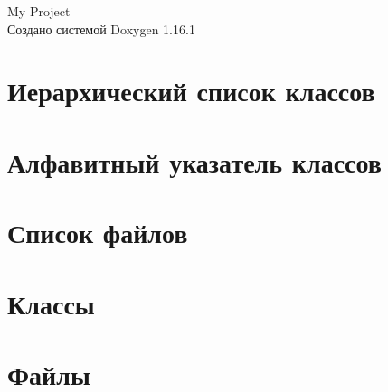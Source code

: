 \documentclass[twoside]{book}
\newcommand{\+}{\discretionary{\mbox{\scriptsize$\hookleftarrow$}}{}{}}
\newcommand{\clearemptydoublepage}{%
    \newpage{\pagestyle{empty}\cleardoublepage}%
  }
\begin{document}
  \raggedbottom
    \hypersetup{pageanchor=false,
                bookmarksnumbered=true,
                pdfencoding=unicode
               }
  \begin{titlepage}
  \vspace*{7cm}
  \begin{center}%
  {\Large My Project}\\
  \vspace*{1cm}
  {\large Создано системой Doxygen 1.16.1}\\
  \end{center}
  \end{titlepage}
  \clearemptydoublepage
  \tableofcontents
  \clearemptydoublepage
  \hypersetup{pageanchor=true}
\chapter{Иерархический список классов}

\chapter{Алфавитный указатель классов}

\chapter{Список файлов}

\chapter{Классы}


\chapter{Файлы}

  \backmatter
  \newpage
  \clearemptydoublepage
  \printindex
\end{document}
